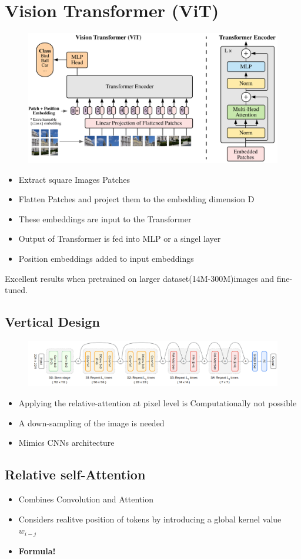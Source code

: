 \section{Vision Transformer (ViT)}
\begin{figure}[]
    \includegraphics[width=\columnwidth]{figures/VisionTransformer/ViT.png}
\end{figure}
\begin{itemize}
    \item Extract square Images Patches
    \item Flatten Patches and project them to the embedding dimension D
    \item These embeddings are input to the Transformer
    \item Output of Transformer is fed into MLP or a singel layer
    \item Position embeddings added to input embeddings
\end{itemize}

Excellent results when pretrained on larger dataset(14M-300M)images and fine-tuned.

\subsection{Vertical Design}
\begin{figure}[!h]
    \includegraphics[width=\columnwidth]{figures/VisionTransformer/verticalDesign.png}
\end{figure}
\begin{itemize}
    \item Applying the relative-attention at pixel level is Computationally not possible
    \item A down-sampling of the image is needed
    \item Mimics CNNs architecture
\end{itemize}
\subsection{Relative self-Attention}
\begin{itemize}
    \item Combines Convolution and Attention
    \item Considers realitve position of tokens by introducing a global kernel value \(w_{i-j}\)
    \item  \textbf{Formula!}
\end{itemize}